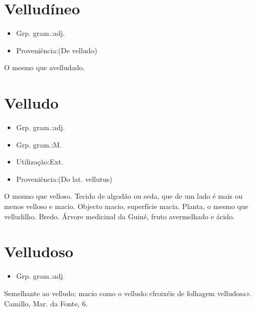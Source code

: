 \documentclass{article}
\begin{document}
\section{Velludíneo}
\begin{itemize}
\item {Grp. gram.:adj.}
\end{itemize}
\begin{itemize}
\item {Proveniência:(De \textunderscore velludo\textunderscore )}
\end{itemize}
O mesmo que \textunderscore avelludado\textunderscore .
\section{Velludo}
\begin{itemize}
\item {Grp. gram.:adj.}
\end{itemize}
\begin{itemize}
\item {Grp. gram.:M.}
\end{itemize}
\begin{itemize}
\item {Utilização:Ext.}
\end{itemize}
\begin{itemize}
\item {Proveniência:(Do lat. \textunderscore vellutus\textunderscore )}
\end{itemize}
O mesmo que \textunderscore velloso\textunderscore .
Tecido de algodão ou seda, que de um lado é mais ou menos velloso e macio.
Objecto macio, superfície macia.
Planta, o mesmo que \textunderscore velludilho\textunderscore .
Bredo.
Árvore medicinal da Guiné, fruto avermelhado e ácido.
\section{Velludoso}
\begin{itemize}
\item {Grp. gram.:adj.}
\end{itemize}
Semelhante ao velludo; macio como o velludo:«\textunderscore froixéis de folhagem velludosa\textunderscore ». Camillo, \textunderscore Mar. da Fonte\textunderscore , 6.
\end{document}
